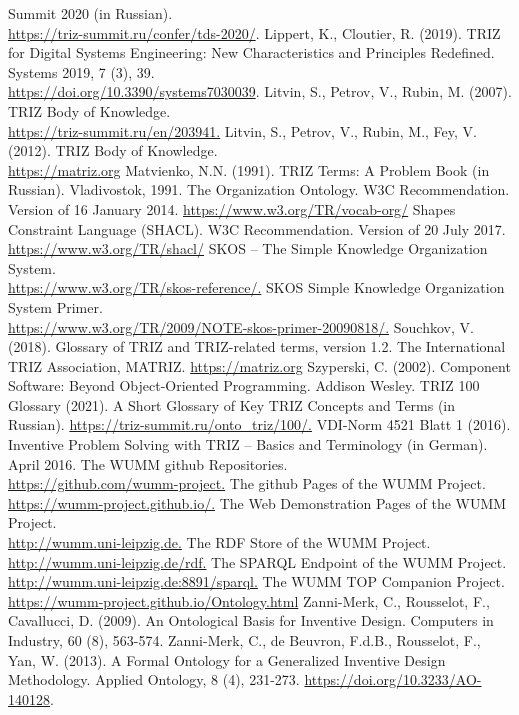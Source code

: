 \documentclass[12pt,a4paper]{article}
\begin{document}
\begin{thebibliography}{xxx}
  Summit 2020 (in Russian).\\ \url{https://triz-summit.ru/confer/tds-2020/}. 
 Lippert, K., Cloutier, R. (2019). TRIZ for Digital Systems
  Engineering: New Characteristics and Principles Redefined. Systems 2019,
  7 (3), 39.\\  \url{https://doi.org/10.3390/systems7030039}.
 Litvin, S., Petrov, V., Rubin, M. (2007). TRIZ Body of
  Knowledge.\\ \url{https://triz-summit.ru/en/203941.}
 Litvin, S., Petrov, V., Rubin, M., Fey, V. (2012). TRIZ Body of
  Knowledge.\\  \url{https://matriz.org}
 Matvienko, N.N. (1991). TRIZ Terms: A Problem Book (in Russian).
  Vladivostok, 1991.
 The Organization Ontology. W3C Recommendation. Version of 16
  January 2014.  \url{https://www.w3.org/TR/vocab-org/}
 Shapes Constraint Language (SHACL). W3C Recommendation. Version
  of 20 July 2017. \url{https://www.w3.org/TR/shacl/}
 SKOS – The Simple Knowledge Organization System.\\
  \url{https://www.w3.org/TR/skos-reference/.}
 SKOS Simple Knowledge Organization System Primer.\\
  \url{https://www.w3.org/TR/2009/NOTE-skos-primer-20090818/.}
 Souchkov, V. (2018). Glossary of TRIZ and TRIZ-related terms,
  version 1.2. The International TRIZ Association, MATRIZ.
  \url{https://matriz.org}
 Szyperski, C. (2002). Component Software: Beyond Object-Oriented
  Programming. Addison Wesley.
 TRIZ 100 Glossary (2021). A Short Glossary of Key TRIZ Concepts
  and Terms (in Russian).  \url{https://triz-summit.ru/onto_triz/100/.}
 VDI-Norm 4521 Blatt 1 (2016). Inventive Problem Solving with TRIZ
  – Basics and Terminology (in German). April 2016.
 The WUMM github Repositories.\\
  \url{https://github.com/wumm-project.}
 The github Pages of the WUMM Project.\\
  \url{https://wumm-project.github.io/.}
 The Web Demonstration Pages of the WUMM Project.\\
  \url{http://wumm.uni-leipzig.de.}
 The RDF Store of the WUMM Project.\\
  \url{http://wumm.uni-leipzig.de/rdf.}
 The SPARQL Endpoint of the WUMM Project.\\
  \url{http://wumm.uni-leipzig.de:8891/sparql.}
 The WUMM TOP Companion Project.\\
  \url{https://wumm-project.github.io/Ontology.html}
 Zanni-Merk, C., Rousselot, F., Cavallucci, D. (2009). An
  Ontological Basis for Inventive Design. Computers in Industry, 60 (8),
  563-574.
 Zanni-Merk, C., de Beuvron, F.d.B., Rousselot, F., Yan, W.
  (2013).  A Formal Ontology for a Generalized Inventive Design Methodology.
  Applied Ontology, 8 (4), 231-273.  \url{https://doi.org/10.3233/AO-140128}.
\end{thebibliography}

\ccnotice
\end{document}
